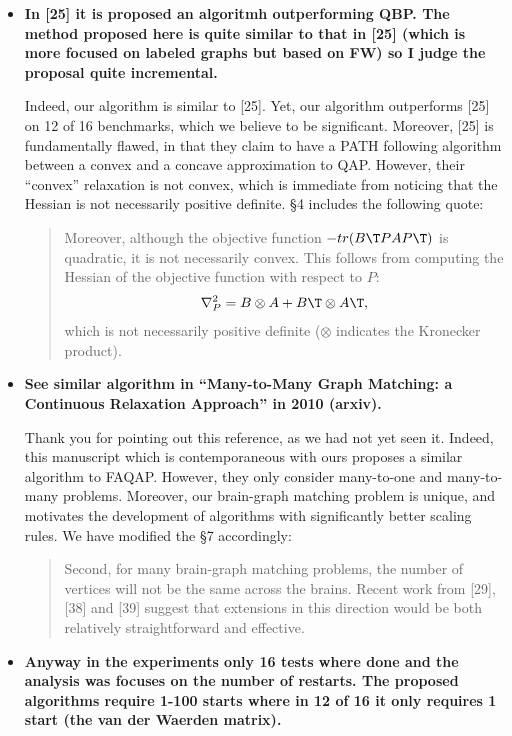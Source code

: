 \documentclass[11pt]{article}
\begin{document}
\begin{itemize}
	\item \textbf{In [25] it is proposed an algoritmh outperforming QBP. The method proposed here is quite similar to that in [25] (which is more focused on labeled graphs but based on FW) so I judge the proposal quite incremental.}

Indeed, our algorithm is similar to [25].  Yet, our algorithm outperforms [25] on 12 of 16 benchmarks, which we believe to be significant.  Moreover, [25] is fundamentally flawed, in that they claim to have a PATH following algorithm between a convex and a concave approximation to QAP.  However, their ``convex'' relaxation is not convex, which is immediate from noticing that the Hessian is not necessarily positive definite.  \S 4 includes the following quote:
	
	\begin{quote}
		Moreover, although the objective function $- tr(B\T PAP\T)$ is quadratic, it is not necessarily convex.  This follows from computing the Hessian of the objective function with respect to $P$:
		\begin{align}
			\nabla_P^2  =  B \otimes A + B\T \otimes A\T,
		\end{align}
		which is not necessarily positive definite ($\otimes$ indicates the Kronecker product).
\end{quote}

	\item \textbf{See similar algorithm in ``Many-to-Many Graph Matching: a Continuous Relaxation Approach'' in 2010 (arxiv).}

Thank you for pointing out this reference, as we had not yet seen it.  Indeed, this manuscript which is contemporaneous with ours proposes a similar algorithm to FAQAP.  However, they only consider many-to-one and many-to-many problems. Moreover, our brain-graph matching problem is unique, and motivates the development of algorithms with significantly better scaling rules.  We have modified the \S 7 accordingly:

\begin{quote}
	Second, for many brain-graph matching problems, the number of vertices will not be the same across the brains.  Recent work from [29],[38]  and [39] suggest that extensions in this direction would be both relatively straightforward and effective. 
\end{quote}



	\item \textbf{Anyway in the experiments only 16 tests where done and the analysis was focuses on the number of restarts. The proposed algorithms require 1-100 starts where in 12 of 16 it only requires 1 start (the van der Waerden matrix).}


\end{itemize}
\end{document}
